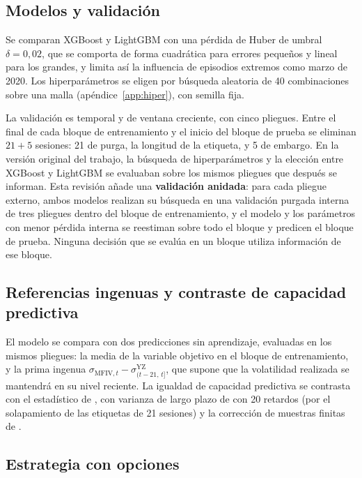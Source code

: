 \documentclass[11pt,a4paper]{article}
\begin{document}
\subsection{Modelos y validación}

Se comparan XGBoost y LightGBM con una pérdida de Huber \citep{huber1964} de umbral $\delta=0{,}02$, que se comporta de forma cuadrática para errores pequeños y lineal para los grandes, y limita así la influencia de episodios extremos como marzo de 2020. Los hiperparámetros se eligen por búsqueda aleatoria de 40 combinaciones sobre una malla (apéndice~\ref{app:hiper}), con semilla fija.

La validación es temporal y de ventana creciente, con cinco pliegues. Entre el final de cada bloque de entrenamiento y el inicio del bloque de prueba se eliminan $21+5$ sesiones: 21 de purga, la longitud de la etiqueta, y 5 de embargo. En la versión original del trabajo, la búsqueda de hiperparámetros y la elección entre XGBoost y LightGBM se evaluaban sobre los mismos pliegues que después se informan. Esta revisión añade una \textbf{validación anidada}: para cada pliegue externo, ambos modelos realizan su búsqueda en una validación purgada interna de tres pliegues dentro del bloque de entrenamiento, y el modelo y los parámetros con menor pérdida interna se reestiman sobre todo el bloque y predicen el bloque de prueba. Ninguna decisión que se evalúa en un bloque utiliza información de ese bloque.

\subsection{Referencias ingenuas y contraste de capacidad predictiva}

El modelo se compara con dos predicciones sin aprendizaje, evaluadas en los mismos pliegues: la media de la variable objetivo en el bloque de entrenamiento, y la prima ingenua $\sigma_{\text{MFIV},t}-\sigma^{\text{YZ}}_{(t-21,\,t]}$, que supone que la volatilidad realizada se mantendrá en su nivel reciente. La igualdad de capacidad predictiva se contrasta con el estadístico de \citet{dieboldmariano1995}, con varianza de largo plazo de \citet{neweywest1987} con 20 retardos (por el solapamiento de las etiquetas de 21 sesiones) y la corrección de muestras finitas de \citet{hln1997}.

\subsection{Estrategia con opciones}\label{sec:estrategia}
\end{document}
